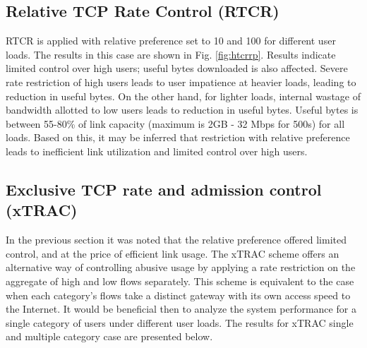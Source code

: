 \documentclass[conference]{../../IEEEtran}
\begin{document}
\subsection{Relative TCP Rate Control (RTCR)}

RTCR is applied with relative preference set to 10 and 100 for different user loads. The results in this case are shown in Fig. \ref{fig:htcrrp}. Results indicate limited control over high users; useful bytes downloaded is also affected. Severe rate restriction of high users leads to user impatience at heavier loads, leading to reduction in useful bytes. On the other hand, for lighter loads, internal wastage of bandwidth allotted to low users leads to reduction in useful bytes. Useful bytes is between 55-80\% of link capacity (maximum is 2GB - 32 Mbps for 500s) for all loads. Based on this, it may be inferred that restriction with relative preference leads to inefficient link utilization and limited control over high users. 



\subsection{Exclusive TCP rate and admission control (xTRAC)}
\label{sec:tcracalgo}

In the previous section it was noted that the relative preference offered limited control, and at the price of efficient link usage. The xTRAC scheme offers an alternative way of controlling abusive usage by applying a rate restriction on the aggregate of high and low flows separately. This scheme is equivalent to the case when each category's flows take a distinct gateway with its own access speed to the Internet. It would be beneficial then to analyze the system performance for a single category of users under different user loads. The results for xTRAC single and multiple category case are presented below.
\end{document}
